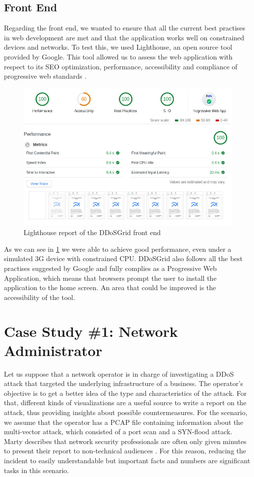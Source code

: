 \subsection{Front End}\label{frontendevaluation}
Regarding the front end, we wanted to ensure that all the current best practises in web development are met and that the application works well on constrained devices and networks. To test this, we used Lighthouse, an open source tool provided by Google. This tool allowed us to assess the web application with respect to its SEO optimization, performance, accessibility and compliance of progressive web standards \cite{lighthouse}.
\begin{figure}
    \centering
    \includegraphics[width=12cm]{images/lighthouse.jpeg}
    \caption{Lighthouse report of the DDoSGrid front end}
    \label{fig:lightouse}
\end{figure}
As we can see in \ref{fig:lightouse} we were able to achieve good performance, even under a simulated 3G device with constrained CPU. DDoSGrid also follows all the best practises suggested by Google and fully complies as a Progressive Web Application, which means that browsers prompt the user to install the application to the home screen. An area that could be improved is the accessibility of the tool.

\section{Case Study \#1: Network Administrator}
Let us suppose that a network operator is in charge of investigating a DDoS attack that targeted the underlying infrastructure of a business. The operator's objective is to get a better idea of the type and characteristics of the attack. For that, different kinds of visualizations are a useful source to write a report on the attack, thus providing insights about possible countermeasures. For the scenario, we assume that the operator has a PCAP file containing information about the multi-vector attack, which consisted of a port scan and a SYN-flood attack. Marty describes that network security professionals are often only given minutes to present their report to non-technical audiences \cite{appliedsecurityvisualization}. For this reason, reducing the incident to easily understandable but important facts and numbers are significant tasks in this scenario.

